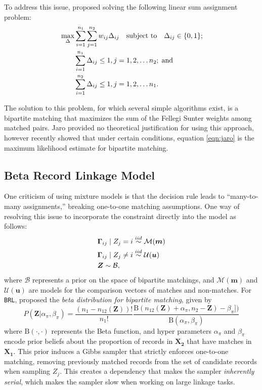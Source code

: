 \documentclass[12pt,letterpaper]{article}
\newcommand{\1}[1]{\mathbb{I}\!\left[#1\right]} %
\begin{document}
To address this issue, \cite{jaro1989} proposed solving the following linear sum assignment problem:
\begin{align}
	\label{eqn:jaro}
	&\max_{\Delta} \sum_{i=1}^{n_1} \sum_{j=1}^{n_2} w_{ij} \Delta_{ij} 
	\quad \text{subject to} \quad \Delta_{ij} \in \{0,1\}; \\
	& \quad \quad \sum_{i=1}^{n_1}  \Delta_{ij}  \leq 1, j=1,2, \ldots n_2; \; \text{and} \notag\\
	& \quad \quad\sum_{i=1}^{n_2}  \Delta_{ij}  \leq 1, j=1,2, \ldots n_1. \notag
\end{align}

The solution to this problem, for which several simple algorithms exist, is a bipartite matching that maximizes the sum of the Fellegi Sunter weights among matched pairs. Jaro provided no theoretical justification for using this approach, however \cite{sadinle_bayesian_2017} recently showed that under certain conditions, equation \ref{eqn:jaro} is the maximum likelihood estimate for bipartite matching. 

\subsection{Beta Record Linkage Model}
\label{BRL}

One criticism of using mixture models is that the decision rule leads to ``many-to-many assignments,'' breaking one-to-one matching assumptions. One way of resolving this issue to incorporate the constraint directly into the model as follows:
\begin{align}
	&\bm{\Gamma}_{ij} \mid Z_j =i \stackrel{iid}{\sim} \mathcal{M}(\bm{m})  \\
	&\bm{\Gamma}_{ij} \mid Z_j \neq i \stackrel{iid}{\sim} \mathcal{U}(\bm{u}) \notag \\
	& \bm{Z} \sim \mathcal{B}, \notag
\end{align}
where $\mathcal{B}$ represents a prior on the space of bipartite matchings, and $\mathcal{M}(\bm{m})$ and $\mathcal{U}(\bm{u})$ are models for the comparison vectors of matches and non-matches. For \texttt{BRL}, \cite{sadinle_bayesian_2017} proposed the \emph{beta distribution for bipartite matching}, given by
$$P(\bm{Z}|\alpha_{\pi}, \beta_{\pi}) = \frac{(n_1 - n_{12}(\bm{Z}))!}{n_1 !}\frac{\text{B}(n_{12}(\bm{Z}) + \alpha_{\pi}, n_2 - \bm{Z}) - \beta_{\pi}])}{\text{B}(\alpha_{\pi}, \beta_{\pi})}
$$
where $\text{B}(\cdot, \cdot)$ represents the Beta function, and hyper parameters $\alpha_{\pi}$ and $\beta_{\pi}$ encode prior beliefs about the proportion of records in $\bm{X_2}$ that have matches in $\bm{X_1}$. This prior induces a Gibbs sampler that strictly enforces one-to-one matching, removing previously matched records from the set of candidate
records when sampling \(Z_j\). This creates a dependency that makes the
sampler \emph{inherently serial}, which makes the sampler slow when working on large linkage tasks. 
\end{document}
